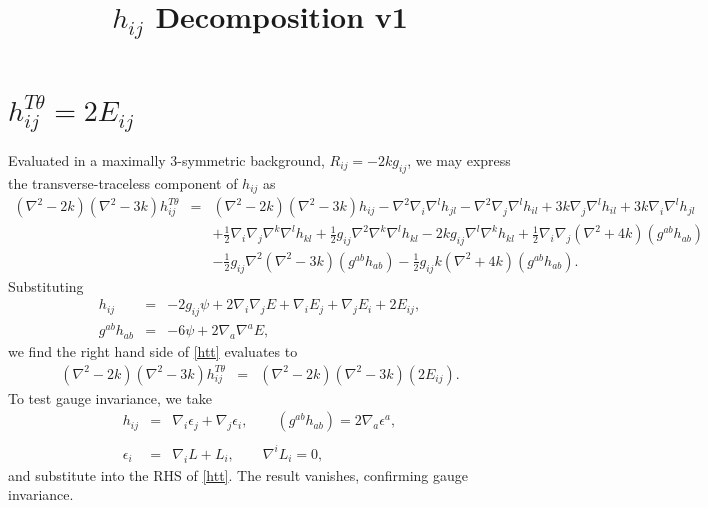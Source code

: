 \documentclass[10pt,letterpaper]{article}
\title{$h_{ij}$ Decomposition v1}
\date{}
\numberwithin{equation}{section}
\begin{document}
 
\maketitle
\noindent 
\section{$h^{T\theta}_{ij}=2E_{ij}$}
Evaluated in a maximally 3-symmetric background, $R_{ij} = -2k g_{ij}$, we may express the transverse-traceless component of $h_{ij}$ as
\begin{eqnarray}
(\nabla^2-2k)(\nabla^2-3k)h_{ij}^{T\theta}
&=&(\nabla^2-2k)(\nabla^2-3k)h_{ij}-\nabla^2 \nabla_i \nabla^l h_{jl} - \nabla^2 \nabla_j \nabla^l h_{il}+3k\nabla_j \nabla^l h_{il}+3k\nabla_i \nabla^l h_{jl}
\nonumber\\
&&+\tfrac12 \nabla_i\nabla_j \nabla^k \nabla^l h_{kl}+\tfrac12 g_{ij} \nabla^2 \nabla^k \nabla^l h_{kl}
-2k g_{ij} \nabla^l \nabla^k h_{kl}+ \tfrac12 \nabla_i \nabla_j (\nabla^2+4k)(g^{ab}h_{ab})
\nonumber\\
&& -\tfrac12 g_{ij}\nabla^2(\nabla^2-3k)(g^{ab}h_{ab})-\tfrac12 g_{ij} k (\nabla^2+4k)(g^{ab}h_{ab}).
\label{htt}
\end{eqnarray}
Substituting
\begin{eqnarray}
h_{ij} &=& -2 g_{ij}\psi + 2\nabla_i\nabla_j E + \nabla_i E_j +\nabla_j E_i + 2E_{ij},
\nonumber\\
g^{ab}h_{ab} &=& -6 \psi + 2 \nabla_a\nabla^a E,
\end{eqnarray}
we find the right hand side of \eqref{htt} evaluates to
\begin{eqnarray}
(\nabla^2-2k)(\nabla^2-3k)h_{ij}^{T\theta} &=& (\nabla^2-2k)(\nabla^2-3k)(2E_{ij}).
\end{eqnarray}
To test gauge invariance, we take
\begin{eqnarray}
h_{ij} &=& \nabla_i\epsilon_j +\nabla_j \epsilon_i,\qquad (g^{ab}h_{ab})= 2\nabla_a \epsilon^a,
\\ \nonumber\\
\epsilon_i &=& \nabla_i L + L_i,\qquad \nabla^i L_i = 0,
\end{eqnarray}
and substitute into the RHS of \eqref{htt}. The result vanishes, confirming gauge invariance.
\end{document}
